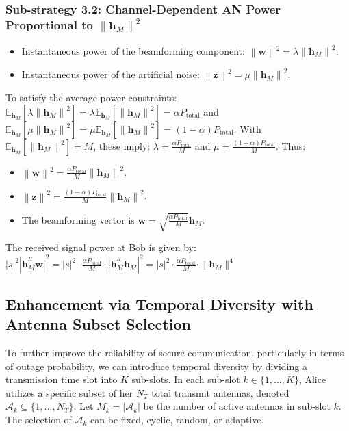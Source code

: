 \documentclass[10pt,a4paper]{article} %
\newcommand{\norm}[1]{\left\| #1 \right\|}
\newcommand{\herm}{^H} %
\newcommand{\E}{\mathbb{E}} %
\begin{document}
\subsubsection{Sub-strategy 3.2: Channel-Dependent AN Power Proportional to $\norm{\mathbf{h}_M}^2$}
\begin{itemize}
    \item Instantaneous power of the beamforming component: $\norm{\mathbf{w}}^2 = \lambda \norm{\mathbf{h}_M}^2$.
    \item Instantaneous power of the artificial noise: $\norm{\mathbf{z}}^2 = \mu \norm{\mathbf{h}_M}^2$.
\end{itemize}
To satisfy the average power constraints:
$\E_{\mathbf{h}_M}[\lambda \norm{\mathbf{h}_M}^2] = \lambda \E_{\mathbf{h}_M}[\norm{\mathbf{h}_M}^2] = \alpha P_{\text{total}}$ and $\E_{\mathbf{h}_M}[\mu \norm{\mathbf{h}_M}^2] = \mu \E_{\mathbf{h}_M}[\norm{\mathbf{h}_M}^2] = (1-\alpha)P_{\text{total}}$.
With $\E_{\mathbf{h}_M}[\norm{\mathbf{h}_M}^2] = M$, these imply:
$\lambda = \frac{\alpha P_{\text{total}}}{M}$ and $\mu = \frac{(1-\alpha)P_{\text{total}}}{M}$.
Thus:
\begin{itemize}
    \item $\norm{\mathbf{w}}^2 = \frac{\alpha P_{\text{total}}}{M} \norm{\mathbf{h}_M}^2$.
    \item $\norm{\mathbf{z}}^2 = \frac{(1-\alpha)P_{\text{total}}}{M} \norm{\mathbf{h}_M}^2$.
    \item The beamforming vector is $\mathbf{w} = \sqrt{\frac{\alpha P_{\text{total}}}{M}} \mathbf{h}_M$.
\end{itemize}
The received signal power at Bob is given by: $|s|^2 \left| \mathbf{h}_M^{\herm} \mathbf{w} \right|^2 = |s|^2 \cdot \frac{\alpha P_{\text{total}}}{M} \cdot \left| \mathbf{h}_M^{\herm} \mathbf{h}_M \right|^2 = |s|^2 \cdot \frac{\alpha P_{\text{total}}}{M} \cdot \| \mathbf{h}_M \|^4$


\subsection{Enhancement via Temporal Diversity with Antenna Subset Selection}

To further improve the reliability of secure communication, particularly in terms of outage probability, we can introduce temporal diversity by dividing a transmission time slot into $K$ sub-slots. In each sub-slot $k \in \{1, \dots, K\}$, Alice utilizes a specific subset of her $N_T$ total transmit antennas, denoted $\mathcal{A}_k \subseteq \{1, \dots, N_T\}$. Let $M_k = |\mathcal{A}_k|$ be the number of active antennas in sub-slot $k$. The selection of $\mathcal{A}_k$ can be fixed, cyclic, random, or adaptive.
\end{document}
